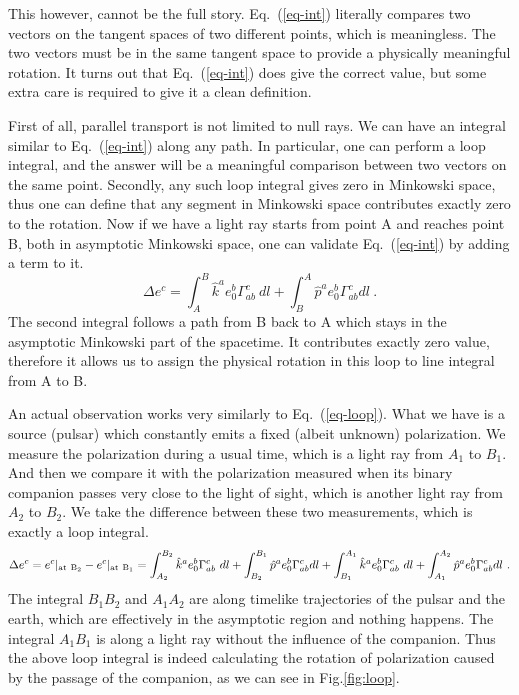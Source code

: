 \documentclass[aps,showpacs,onecolumn,floats,prd,superscriptaddress,nofootinbib]{revtex4}
\begin{document}
This however, cannot be the full story. 
Eq.~(\ref{eq-int}) literally compares two vectors on the tangent spaces of two different points, which is meaningless. 
The two vectors must be in the same tangent space to provide a physically meaningful rotation. 
It turns out that Eq.~(\ref{eq-int}) does give the correct value, but some extra care is required to give it a clean definition.

First of all, parallel transport is not limited to null rays. 
We can have an integral similar to Eq.~(\ref{eq-int}) along any path. 
In particular, one can perform a loop integral, and the answer will be a meaningful comparison between two vectors on the same point. 
Secondly, any such loop integral gives zero in Minkowski space, thus one can define that any segment in Minkowski space contributes exactly zero to the rotation. 
Now if we have a light ray starts from point A and reaches point B, both in asymptotic Minkowski space, one can validate Eq.~(\ref{eq-int}) by adding a term to it.
\begin{equation}
\Delta e^c = \int_A^B \hat{k}^a e_0^b \Gamma_{ab}^c~dl +
 \int_B^A \hat{p}^a e_0^b \Gamma_{ab}^c dl~.
\label{eq-loop}
\end{equation}
The second integral follows a path from B back to A which stays in the asymptotic Minkowski part of the spacetime. 
It contributes exactly zero value, therefore it allows us to assign the physical rotation in this loop to line integral from A to B.

An actual observation works very similarly to Eq.~(\ref{eq-loop}). 
What we have is a source (pulsar) which constantly emits a fixed (albeit unknown) polarization. 
We measure the polarization during a usual time, which is a light ray from $A_1$ to $B_1$. 
And then we compare it with the polarization measured when its binary companion passes very close to the light of sight, which is another light ray from $A_2$ to $B_2$. 
We take the difference between these two measurements, which is exactly a loop integral.
\begin{equation}
\Delta e^c = e^c|_{\rm at \ B_2} - e^c|_{\rm at \ B_1}
= \int_{A_2}^{B_2} \hat{k}^a e_0^b \Gamma_{ab}^c~dl +
\int_{B_2}^{B_1} \hat{p}^a e_0^b \Gamma_{ab}^c dl +
\int_{B_1}^{A_1} \hat{k}^a e_0^b \Gamma_{ab}^c~dl +
\int_{A_1}^{A_2} \hat{p}^a e_0^b \Gamma_{ab}^c dl~.
\label{eq-pulsar}
\end{equation}
The integral $B_1B_2$ and $A_1A_2$ are along timelike trajectories of the pulsar and the earth, which are effectively in the asymptotic region and nothing happens. 
The integral $A_1B_1$ is along a light ray without the influence of the companion. 
Thus the above loop integral is indeed calculating the rotation of polarization caused by the passage of the companion, as we can see in Fig.\ref{fig:loop}.
\end{document}
